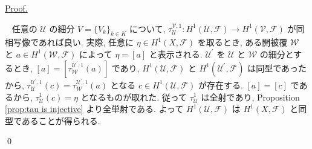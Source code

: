 \documentclass[a4paper,10pt,dvipdfmx]{jsreport}
\renewenvironment{proof}{\begin{flushleft} \underline{Proof.} \end{flushleft}\vspace{-1zh}\ }{\qed\\}
\theoremstyle{definition}
\begin{document}
\begin{proof}
    任意の \(\mathcal{U}\) の細分 \(V= \{V_k\}_{k\in K}\) について, \(\tau_\mathcal{U} ^{\mathcal{V},1} \colon H^1(\mathcal{U},\mathscr{F}) \to H^1(\mathcal{V},\mathscr{F})\) が同相写像であれば良い. 実際, 任意に \(\eta \in H^1(X,\mathscr{F})\) を取るとき, ある開被覆 \(\mathcal{W}\) と \(a \in H^1(\mathcal{W},\mathscr{F})\) によって \(\eta = [a]\) と表示される. \(\mathcal{U}^\prime \) を \(\mathcal{U}\) と \(\mathcal{W}\) の細分とするとき, \([a] = \left[ \tau_\mathcal{W}^{\mathcal{U}^\prime,1}(a) \right]\) であり, \(H^1(\mathcal{U},\mathscr{F})\) と \(H^1(\mathcal{U}^\prime ,\mathscr{F})\) は同型であったから, \(\tau_\mathcal{U} ^{\mathcal{U}^\prime,1}(c) = \tau_\mathcal{W}^{\mathcal{U}^\prime,1}(a)\) となる \(c\in H^1(\mathcal{U},\mathscr{F})\) が存在する. \([a] = [c]\) であるから, \(\tau_\mathcal{U}^1(c) = \eta\) となるものが取れた. 従って \(\tau_\mathcal{U}^1\) は全射であり, Proposition \ref{prop:tau is injective} より全単射である. よって \(H^1(\mathcal{U},\mathscr{F})\) は \(H^1(X,\mathscr{F})\) と同型であることが得られる.


\end{proof}
\end{document}
